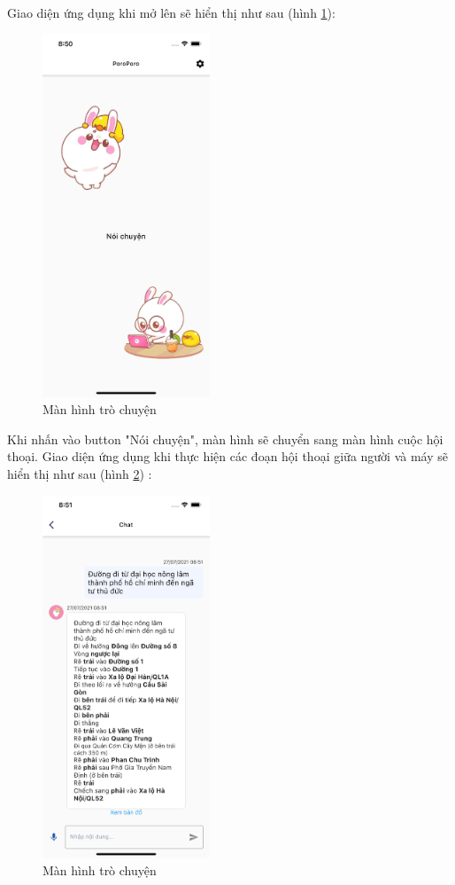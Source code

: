 Giao diện ứng dụng khi mở lên sẽ hiển thị như sau (hình \ref{fig:home}):
\begin{figure}[H]
    \centering
    \includegraphics[width=5cm]{images/home.jpg}
    \caption{Màn hình trò chuyện}
    \label{fig:home}
\end{figure}
Khi nhấn vào button "Nói chuyện", màn hình sẽ chuyển sang màn hình cuộc hội thoại.
Giao diện ứng dụng khi thực hiện các đoạn hội thoại giữa người và máy sẽ hiển thị như sau (hình \ref{fig:screen-chat}) :
\begin{figure}[H]
    \centering
    \includegraphics[width=5cm]{images/Screen-chat.jpg}
    \caption{Màn hình trò chuyện}
    \label{fig:screen-chat}
\end{figure}

